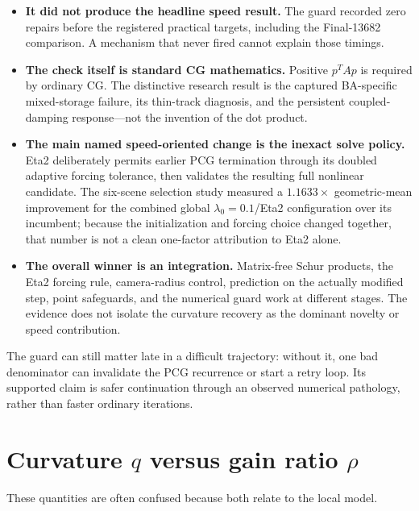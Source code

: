 \documentclass[11pt]{article}
\begin{document}
\begin{itemize}
  \item \textbf{It did not produce the headline speed result.}  The guard recorded zero repairs before the registered practical targets, including the Final-13682 comparison.  A mechanism that never fired cannot explain those timings.
  \item \textbf{The check itself is standard CG mathematics.}  Positive $p^TAp$ is required by ordinary CG.  The distinctive research result is the captured BA-specific mixed-storage failure, its thin-track diagnosis, and the persistent coupled-damping response---not the invention of the dot product.
  \item \textbf{The main named speed-oriented change is the inexact solve policy.}  Eta2 deliberately permits earlier PCG termination through its doubled adaptive forcing tolerance, then validates the resulting full nonlinear candidate.  The six-scene selection study measured a $1.1633\times$ geometric-mean improvement for the combined global $\lambda_0=0.1$/Eta2 configuration over its incumbent; because the initialization and forcing choice changed together, that number is not a clean one-factor attribution to Eta2 alone.
  \item \textbf{The overall winner is an integration.}  Matrix-free Schur products, the Eta2 forcing rule, camera-radius control, prediction on the actually modified step, point safeguards, and the numerical guard work at different stages.  The evidence does not isolate the curvature recovery as the dominant novelty or speed contribution.
\end{itemize}

The guard can still matter late in a difficult trajectory: without it, one bad denominator can invalidate the PCG recurrence or start a retry loop.  Its supported claim is safer continuation through an observed numerical pathology, rather than faster ordinary iterations.

\section{\texorpdfstring{Curvature $q$ versus gain ratio $\rho$}{Curvature q versus gain ratio rho}}

These quantities are often confused because both relate to the local model.
\end{document}
